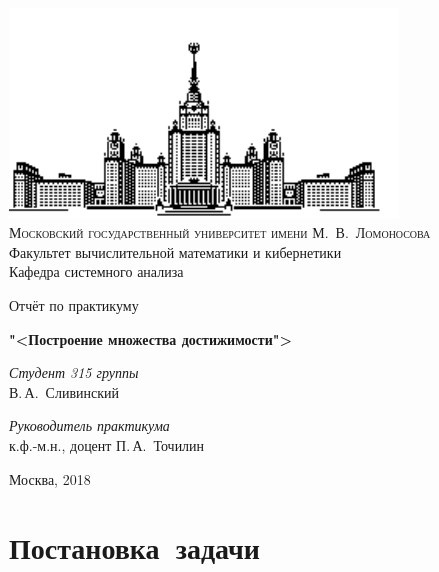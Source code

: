 \documentclass[11pt, oneside, final]{article}
\theoremstyle{break}
\numberwithin{equation}{section}
\theoremstyle{plain}
\theoremstyle{definition}
\begin{document}
    \thispagestyle{empty}
    \begin{center}
        \ \vspace{-3cm}
    
        \includegraphics[width=0.5
        \textwidth]{msu}\\
        {\scshape Московский государственный университет имени М.~В.~Ломоносова}\\
        Факультет вычислительной математики и кибернетики\\
        Кафедра системного анализа
    
        \vfill
    
        {\LARGE Отчёт по практикуму}
    
        \vspace{1cm}
    
        {\Huge\bfseries "<Построение множества достижимости">} 
    \end{center}

    \vspace{1cm}
    \begin{flushright}
        \large \textit{Студент 315 группы}\\
        В.\,А.~Сливинский
    
        \vspace{5mm}
    
        \textit{Руководитель практикума}\\
        к.ф.-м.н., доцент П.\,А.~Точилин 
    \end{flushright}

    \vfill
    \begin{center}
        Москва, 2018 
    \end{center}
    \pagebreak

    \tableofcontents

    \pagebreak



    \section{Постановка~задачи}
    \label{sec:task}
\end{document}
